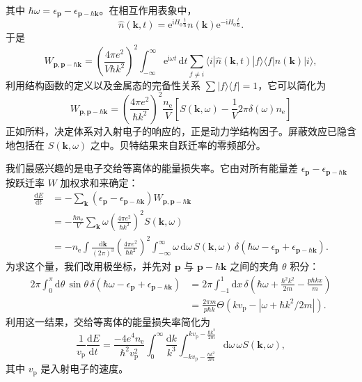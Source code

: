 其中 $\hbar\omega=\epsilon_{\mathbf{p}}-\epsilon_{\mathbf{p}-\hbar\mathbf{k}}$。在相互作用表象中，
\begin{equation*}
\widehat{n}(\mathbf{k},t)=\mathrm{e}^{\mathrm{i}H_{0}\frac{t}{\hbar}}n(\mathbf{k})\mathrm{e}^{-\mathrm{i}H_{0}\frac{t}{\hbar}}.
\tag{9.148}
\end{equation*}
于是
\begin{equation*}
W_{\mathbf{p},\mathbf{p}-\hbar\mathbf{k}}=\left(\frac{4\pi e^{2}}{V\hbar k^{2}}\right)^{2}\int_{-\infty}^{\infty}\mathrm{e}^{\mathrm{i}\omega t}\,\mathrm{d}t\sum_{f\neq i}\langle i|\widehat{n}(\mathbf{k},t)|f\rangle\langle f|n(\mathbf{k})|i\rangle,
\tag{9.149}
\end{equation*}
利用结构函数的定义以及金属态的完备性关系 $\sum|f\rangle\langle f|=1$，它可以简化为
\begin{equation*}
W_{\mathbf{p},\mathbf{p}-\hbar\mathbf{k}}=\left(\frac{4\pi e^{2}}{\hbar k^{2}}\right)^{2}\frac{n_{\mathrm{e}}}{V}\left[S(\mathbf{k},\omega)-\frac{1}{V}2\pi\delta(\omega)n_{\mathrm{e}}\right]
\tag{9.150}
\end{equation*}
正如所料，决定体系对入射电子的响应的，正是动力学结构因子。屏蔽效应已隐含地包括在 $S(\mathbf{k},\omega)$ 之中。贝特结果来自跃迁率的零频部分。

我们最感兴趣的是电子交给等离体的能量损失率。它由对所有能量差 $\epsilon_{\mathbf{p}}-\epsilon_{\mathbf{p}-\hbar\mathbf{k}}$ 按跃迁率 $W$ 加权求和来确定：
\begin{align*}
\frac{\mathrm{d}E}{\mathrm{d}t}&=-\sum_{\mathbf{k}}(\epsilon_{\mathbf{p}}-\epsilon_{\mathbf{p}-\hbar\mathbf{k}})W_{\mathbf{p},\mathbf{p}-\hbar\mathbf{k}}\\
&=-\frac{\hbar n_{\mathrm{e}}}{V}\sum_{\mathbf{k}}\omega\left(\frac{4\pi e^{2}}{\hbar k^{2}}\right)^{2}S(\mathbf{k},\omega)\\
&=-n_{\mathrm{e}}\int\frac{\mathrm{d}\mathbf{k}}{(2\pi)^{3}}\left(\frac{4\pi e^{2}}{\hbar k^{2}}\right)^{2}\int_{-\infty}^{\infty}\omega\,\mathrm{d}\omega\,S(\mathbf{k},\omega)\,\delta(\hbar\omega-\epsilon_{\mathbf{p}}+\epsilon_{\mathbf{p}-\hbar\mathbf{k}}).
\tag{9.151}
\end{align*}
为求这个量，我们改用极坐标，并先对 $\mathbf{p}$ 与 $\mathbf{p}-\hbar\mathbf{k}$ 之间的夹角 $\theta$ 积分：
\begin{align*}
2\pi\int_{0}^{\pi}\mathrm{d}\theta\,\sin\theta\,\delta\left(\hbar\omega-\epsilon_{\mathbf{p}}+\epsilon_{\mathbf{p}-\hbar\mathbf{k}}\right)&=2\pi\int_{-1}^{1}\mathrm{d}x\,\delta\left(\hbar\omega+\frac{\hbar^{2}k^{2}}{2m}-\frac{p\hbar kx}{m}\right)\\
&=\frac{2\pi m}{p\hbar k}\Theta\left(kv_{\mathrm{p}}-\left|\omega+\hbar k^{2}/2m\right|\right).
\tag{9.152}
\end{align*}
利用这一结果，交给等离体的能量损失率简化为
\begin{equation*}
\frac{1}{v_{\mathrm{p}}}\frac{\mathrm{d}E}{\mathrm{d}t}=\frac{-4e^{4}n_{\mathrm{e}}}{\hbar^{2}v_{\mathrm{p}}^{2}}\int_{0}^{\infty}\frac{\mathrm{d}k}{k^{3}}\int_{-kv_{\mathrm{p}}-\frac{\hbar k^{2}}{2m}}^{kv_{\mathrm{p}}-\frac{\hbar k^{2}}{2m}}\mathrm{d}\omega\,\omega S(\mathbf{k},\omega),
\tag{9.153}
\end{equation*}
其中 $v_{\mathrm{p}}$ 是入射电子的速度。

